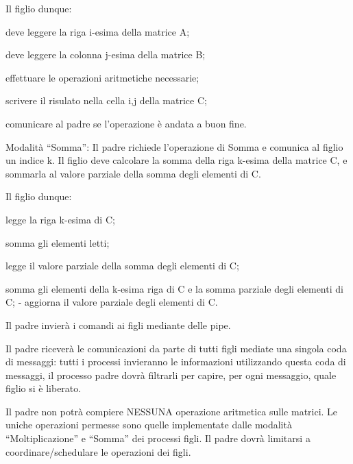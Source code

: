 Il figlio dunque\+:
\begin{DoxyItemize}
\item deve leggere la riga i-\/esima della matrice A;
\item deve leggere la colonna j-\/esima della matrice B;
\item effettuare le operazioni aritmetiche necessarie;
\item scrivere il risulato nella cella i,j della matrice C;
\item comunicare al padre se l’operazione è andata a buon fine.
\end{DoxyItemize}

Modalità “\+Somma”\+: Il padre richiede l’operazione di Somma e comunica al figlio un indice k. Il figlio deve calcolare la somma della riga k-\/esima della matrice C, e sommarla al valore parziale della somma degli elementi di C.

Il figlio dunque\+:
\begin{DoxyItemize}
\item legge la riga k-\/esima di C;
\item somma gli elementi letti;
\item legge il valore parziale della somma degli elementi di C;
\item somma gli elementi della k-\/esima riga di C e la somma parziale degli elementi di C; -\/ aggiorna il valore parziale degli elementi di C.
\end{DoxyItemize}

Il padre invierà i comandi ai figli mediante delle pipe.

Il padre riceverà le comunicazioni da parte di tutti figli mediate una singola coda di messaggi\+: tutti i processi invieranno le informazioni utilizzando questa coda di messaggi, il processo padre dovrà filtrarli per capire, per ogni messaggio, quale figlio si è liberato.

Il padre non potrà compiere N\+E\+S\+S\+U\+NA operazione aritmetica sulle matrici. Le uniche operazioni permesse sono quelle implementate dalle modalità “\+Moltiplicazione” e “\+Somma” dei processi figli. Il padre dovrà limitarsi a coordinare/schedulare le operazioni dei figli.

